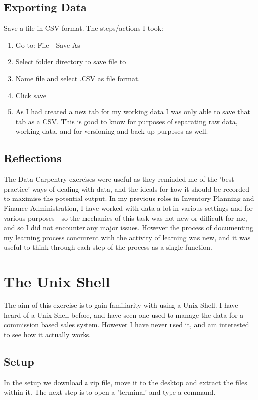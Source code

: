 \documentclass{article}
\begin{document}
\subsection{Exporting Data}
Save a file in CSV format.
The steps/actions I took:
\begin{enumerate}
    \item Go to: File - Save As
    \item Select folder directory to save file to
    \item Name file and select .CSV as file format.
    \item Click save
    \item As I had created a new tab for my working data I was only able to save that tab as a CSV. This is good to know for purposes of separating raw data, working data, and for versioning and back up purposes as well. 
\end{enumerate}

\subsection{Reflections}
The Data Carpentry exercises were useful as they reminded me of the 'best practice' ways of dealing with data, and the ideals for how it should be recorded to maximise the potential output. 
In my previous  roles in Inventory Planning and Finance Administration, I have worked with data a lot in various settings and for various purposes - so the mechanics of this task was not new or difficult for me, and so I did not encounter any major issues. 
However the process of documenting my learning process concurrent with the activity of learning was new, and it was useful to think through each step of the process as a single function. 

\section{The Unix Shell}

The aim of this exercise is to gain familiarity with using a Unix Shell. 
I have heard of a Unix Shell before, and have seen one used to manage the data for a commission based sales system. However I have never used it, and am interested to see how it actually works. 

\subsection{Setup}
In the setup we download a zip file, move it to the desktop and extract the files within it. 
The next step is to open a 'terminal' and type a command. 
\end{document}
